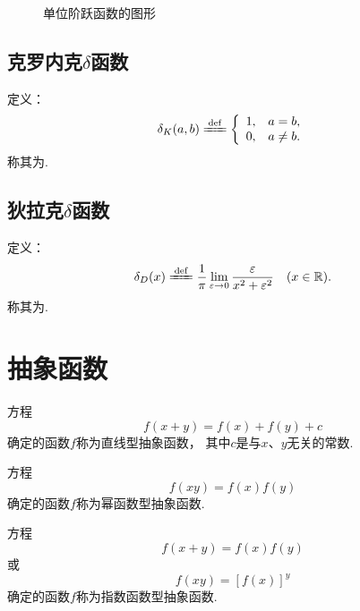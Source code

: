 \begin{figure}[h!]
\centering
{}
\caption{单位阶跃函数的图形}
\end{figure}

\subsection{克罗内克\texorpdfstring{\(\delta\)}{\textdelta}函数}
\begin{definition}
定义：\[
\delta_K(a,b)
\defeq \left\{ \begin{array}{cl}
	1, & a = b, \\
	0, & a \neq b.
\end{array} \right.
\]称其为.
\end{definition}

\subsection{狄拉克\texorpdfstring{\(\delta\)}{\textdelta}函数}
\begin{definition}
定义：\[
\delta_D(x)
\defeq \frac{1}{\pi}
	\lim\limits_{\varepsilon\to0}
	\frac{\varepsilon}{x^2+\varepsilon^2}
\quad(x\in\mathbb{R}).
\]
称其为.
\end{definition}


\section{抽象函数}
方程\[
f(x+y) = f(x) + f(y) + c
\]确定的函数\(f\)称为直线型抽象函数，%
其中\(c\)是与\(x\)、\(y\)无关的常数.

方程\[
f(xy) = f(x) f(y)
\]确定的函数\(f\)称为幂函数型抽象函数.

方程\[
f(x+y) = f(x) f(y)
\]或\[
f(xy) = [f(x)]^y
\]确定的函数\(f\)称为指数函数型抽象函数.

